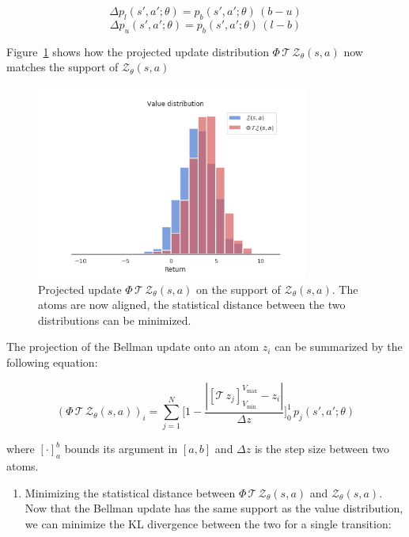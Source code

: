 \documentclass[
  letterpaper,
  DIV=11,
  numbers=noendperiod]{scrreprt}
\providecommand{\tightlist}{%
  \setlength{\itemsep}{0pt}\setlength{\parskip}{0pt}}\usepackage{longtable,booktabs,array}
\begin{document}
\[
    \Delta p_{l}(s', a'; \theta) = p_{b}(s', a'; \theta) \, (b - u)
\] \[
    \Delta p_{u}(s', a'; \theta) = p_{b}(s', a'; \theta) \, (l - b)
\]

Figure~\ref{fig-distributionallearning3} shows how the projected update
distribution \(\Phi \, \mathcal{T} \, \mathcal{Z}_\theta(s, a)\) now
matches the support of \(\mathcal{Z}_\theta(s, a)\)

\begin{figure}

{\centering \includegraphics[width=0.8\textwidth,height=\textheight]{./img/distributionallearning3.png}

}

\caption{\label{fig-distributionallearning3}Projected update
\(\Phi \, \mathcal{T} \, \mathcal{Z}_\theta(s, a)\) on the support of
\(\mathcal{Z}_\theta(s, a)\). The atoms are now aligned, the statistical
distance between the two distributions can be minimized.}

\end{figure}

The projection of the Bellman update onto an atom \(z_i\) can be
summarized by the following equation:

\[
    (\Phi \, \mathcal{T} \, \mathcal{Z}_\theta(s, a))_i = \sum_{j=1}^N \big [1 - \frac{| [\mathcal{T}\, z_j]_{V_\text{min}}^{V_\text{max}} - z_i|}{\Delta z} \big ]_0^1 \, p_j (s', a'; \theta)
\]

where \([\cdot]_a^b\) bounds its argument in \([a, b]\) and \(\Delta z\)
is the step size between two atoms.

\begin{enumerate}
\def\labelenumi{\arabic{enumi}.}
\setcounter{enumi}{2}
\tightlist
\item
  Minimizing the statistical distance between
  \(\Phi \, \mathcal{T} \, \mathcal{Z}_\theta(s, a)\) and
  \(\mathcal{Z}_\theta(s, a)\). Now that the Bellman update has the same
  support as the value distribution, we can minimize the KL divergence
  between the two for a single transition:
\end{enumerate}
\end{document}
